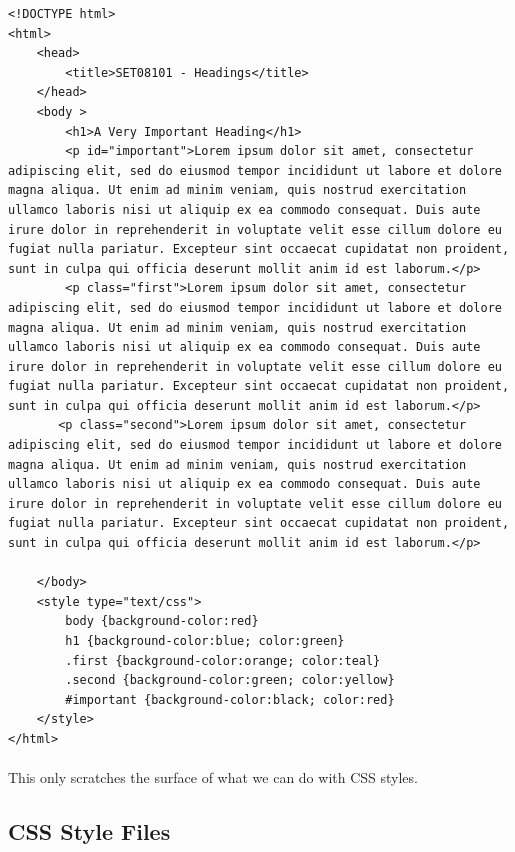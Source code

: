\documentclass[10pt, a4paper, twosize]{article}
\begin{document}
\begin{lstlisting}
<!DOCTYPE html>
<html>
    <head>
        <title>SET08101 - Headings</title>
    </head>
    <body >
        <h1>A Very Important Heading</h1>
        <p id="important">Lorem ipsum dolor sit amet, consectetur adipiscing elit, sed do eiusmod tempor incididunt ut labore et dolore magna aliqua. Ut enim ad minim veniam, quis nostrud exercitation ullamco laboris nisi ut aliquip ex ea commodo consequat. Duis aute irure dolor in reprehenderit in voluptate velit esse cillum dolore eu fugiat nulla pariatur. Excepteur sint occaecat cupidatat non proident, sunt in culpa qui officia deserunt mollit anim id est laborum.</p>
        <p class="first">Lorem ipsum dolor sit amet, consectetur adipiscing elit, sed do eiusmod tempor incididunt ut labore et dolore magna aliqua. Ut enim ad minim veniam, quis nostrud exercitation ullamco laboris nisi ut aliquip ex ea commodo consequat. Duis aute irure dolor in reprehenderit in voluptate velit esse cillum dolore eu fugiat nulla pariatur. Excepteur sint occaecat cupidatat non proident, sunt in culpa qui officia deserunt mollit anim id est laborum.</p>
       <p class="second">Lorem ipsum dolor sit amet, consectetur adipiscing elit, sed do eiusmod tempor incididunt ut labore et dolore magna aliqua. Ut enim ad minim veniam, quis nostrud exercitation ullamco laboris nisi ut aliquip ex ea commodo consequat. Duis aute irure dolor in reprehenderit in voluptate velit esse cillum dolore eu fugiat nulla pariatur. Excepteur sint occaecat cupidatat non proident, sunt in culpa qui officia deserunt mollit anim id est laborum.</p>

    </body>
    <style type="text/css">
        body {background-color:red}
        h1 {background-color:blue; color:green}
        .first {background-color:orange; color:teal}
        .second {background-color:green; color:yellow}
        #important {background-color:black; color:red}
    </style>
</html>
\end{lstlisting}

\paragraph{} This only scratches the surface of what we can do with CSS styles. 

\subsection{CSS Style Files}
\end{document}
